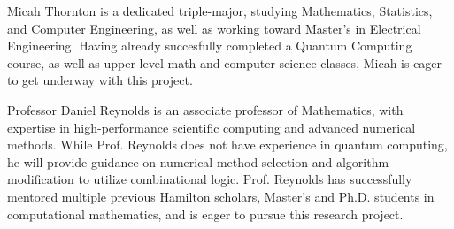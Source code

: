 Micah Thornton is a dedicated triple-major, studying Mathematics,
Statistics, and Computer Engineering, as well as working toward
Master's in Electrical Engineering.  Having already succesfully
completed a Quantum Computing course, as well as upper level math and
computer science classes, Micah is eager to get underway with this
project.

Professor Daniel Reynolds is an associate professor of Mathematics,
with expertise in high-performance scientific computing and advanced
numerical methods.  While Prof. Reynolds does not have experience in
quantum computing, he will provide guidance on numerical method
selection and algorithm modification to utilize combinational logic.
Prof. Reynolds has successfully mentored multiple previous Hamilton
scholars, Master's and Ph.D. students in computational mathematics,
and is eager to pursue this research project. 
